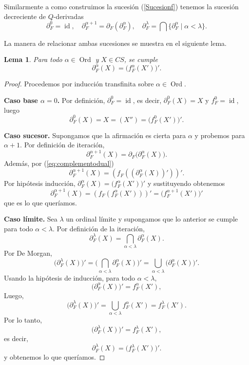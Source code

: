 \documentclass[12pt]{article}
\newtheorem{lem}[thm]{Lema}
\DeclareMathOperator{\Ord}{Ord}
\DeclareMathOperator{\id}{id}
\begin{document}
Similarmente a como construimos la sucesión (\ref{Sucesionf}) tenemos la sucesión decreciente de $Q$-derivadas
\[
\partial_F^0=\id, \quad \partial^{\alpha+1}_F=\partial_F(\partial_F^\alpha), \quad \partial_F^\lambda=\bigcap\{\partial_F^\alpha\mid \alpha<\lambda\}.
\]

La manera de relacionar ambas sucesiones se muestra en el siguiente lema.

\begin{lem}\label{inducciontransfinita}
Para todo $\alpha\in \Ord$ y $X\in CS$, se cumple
\begin{equation}\label{eq:induccion}
\partial_F^\alpha(X)=\big(f_F^\alpha(X')\big)'.
\end{equation}
\end{lem}

\begin{proof}
Procedemos por inducción transfinita sobre $\alpha\in \Ord$.

\smallskip
\noindent\textbf{Caso base $\alpha=0$.}
Por definición, $\partial_F^0=\id$, es decir, $\partial_F^0(X)=X$ y $f_F^0=\id$, luego
\[
\partial_F^0(X)=X=(X'')=\big(f_F^0(X')\big)'.
\]

\smallskip
\noindent\textbf{Caso sucesor.}
Supongamos que la afirmación es cierta para $\alpha$ y probemos para $\alpha+1$.
Por definición de iteración,
\[
\partial_F^{\alpha+1}(X)=\partial_F\big(\partial_F^\alpha(X)\big).
\]
Además, por (\ref{eq:complementodual})
\[
\partial_F^{\alpha+1}(X)
=(f_F((\partial_F^\alpha(X))'))'.
\]
Por hipótesis inducción, $\partial_F^\alpha(X)=\big(f_F^\alpha(X')\big)'$ y sustituyendo obtenemos
\[
\partial_F^{\alpha+1}(X)=(f_F(f_F^\alpha(X')))'=\big(f_F^{\alpha+1}(X')\big)'
\]
que es lo que queríamos.

\smallskip
\noindent\textbf{Caso límite.}
Sea $\lambda$ un ordinal límite y supongamos que lo anterior se cumple para todo $\alpha<\lambda$.
Por definición de la iteración,
\[
\partial_F^\lambda(X)=\bigcap_{\alpha<\lambda}\partial_F^\alpha(X).
\]
Por De Morgan,
\[
\big(\partial_F^\lambda(X)\big)'
=\Big(\bigcap_{\alpha<\lambda}\partial_F^\alpha(X)\Big)'
=\bigcup_{\alpha<\lambda}\big(\partial_F^\alpha(X)\big)'.
\]
Usando la hipótesis de inducción, para todo $\alpha<\lambda$,
\[
\big(\partial_F^\alpha(X)\big)'=f_F^\alpha(X'),
\]
Luego,
\[
\big(\partial_F^\lambda(X)\big)'=\bigcup_{\alpha<\lambda} f_F^\alpha(X')=f_F^\lambda(X').
\]
Por lo tanto,
\[
\big(\partial_F^\lambda(X)\big)'=f_F^\lambda(X'),
\]
es decir,
\[
\partial_F^\lambda(X)=\big(f_F^\lambda(X')\big)'.
\]
y obtenemos lo que queríamos.
\end{proof}
\end{document}
